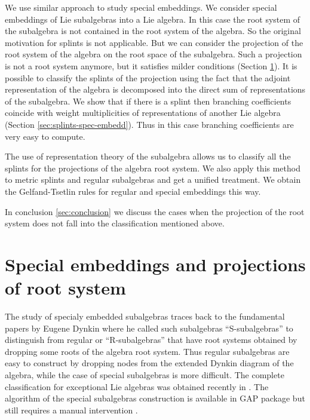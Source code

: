 \documentclass[12pt]{article}
\begin{document}
We use similar approach to study special embeddings. We consider special embeddings of Lie
subalgebras into a Lie algebra. In this case the root system of the subalgebra is not contained in
the root system of the algebra. So the original motivation for splints is not applicable. But we can
consider the projection of the root system of the algebra on the root space of the subalgebra. Such
a projection is not a root system anymore, but it satisfies milder conditions (Section
\ref{sec:spec-embedd-proj}). It is possible to classify the splints of the projection using the fact
that the adjoint representation of the algebra is decomposed into the direct sum of representations
of the subalgebra. We show that if there is a splint then branching coefficients coincide with
weight multiplicities of representations of another Lie algebra (Section
\ref{sec:splints-spec-embedd}). Thus in this case branching coefficients are very easy to compute.

The use of representation theory of the subalgebra allows us to classify all the splints for the projections
of the algebra root system. We also apply this method to metric splints and regular subalgebras and get
a unified treatment. We obtain the Gelfand-Tsetlin rules for regular and special embeddings this way.

In conclusion \ref{sec:conclusion} we discuss the cases when the projection of the root system does
not fall into the classification mentioned above.


\section{Special embeddings and projections of root system}
\label{sec:spec-embedd-proj}

The study of specialy embedded subalgebras traces back to the fundamental papers by Eugene Dynkin
\cite{dynkin1952semisimple,dynkin1952maximal} where he called such subalgebras ``S-subalgebras'' to
distinguish from regular or ``R-subalgebras'' that have root systems obtained by dropping some roots
of the algebra root system. Thus regular subalgebras are easy to construct by dropping nodes from
the extended Dynkin diagram of the algebra, while the case of special subalgebras is more difficult. The complete
classification for exceptional Lie algebras was obtained recently in \cite{minchenko2006semisimple}.
The algorithm of the special subalgebras construction is available in GAP package but still requires
a manual intervention \cite{de2011constructing}.  
\end{document}

